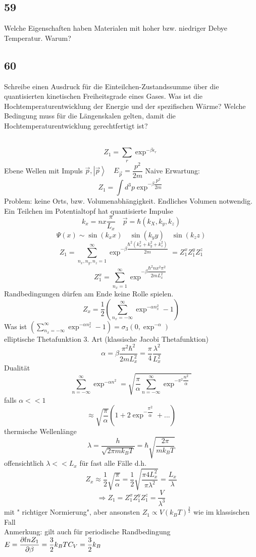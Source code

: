 \documentclass[12pt,a4paper]{report}
\newenvironment{myfrag}{\begin{it}}{\end{it}\vspace{3mm}\par}
\numberwithin{equation}{section}
\begin{document}
\subsection{59}
\begin{myfrag}
Welche Eigenschaften haben Materialen mit hoher bzw. niedriger Debye
Temperatur. Warum?
\end{myfrag}
\subsection{60}
\begin{myfrag}
Schreibe einen Ausdruck für die Einteilchen-Zustandssumme über die
quantisierten kinetischen Freiheitsgrade eines Gases. Was ist die
Hochtemperaturentwicklung der Energie und der spezifischen Wärme?
Welche Bedingung muss für die Längenskalen gelten, damit die
Hochtemperaturentwicklung gerechtfertigt ist?
\end{myfrag} \quad \\
$$ Z_1 = \sum \limits _r \exp ^{-\beta \epsilon_r}$$
Ebene Wellen mit Impuls $\vec{p} ,\left| \vec{p} \right\rangle \quad E_{\vec{p}} = \dfrac{p^2}{2m}$
Naive Erwartung: $$ Z_1 = \int d^3 p \exp ^{-\beta \dfrac{p^2}{2m} } $$
Problem: keine Orts, bzw. Volumenabhängigkeit. Endliches Volumen notwendig. \\[1ex]
Ein Teilchen im Potentialtopf hat quantisierte Impulse
$$ k_x = n x \dfrac{\pi}{L_x} \quad \vec{p} = \hbar(k_X,k_y,k_z) $$
$$ \Psi(x) \sim \sin (k_x x) \quad \sin (k_y y) \quad \sin (k_z z)$$
$$ Z_1 = \sum \limits _{n_x,n_y,n_z=1}^\infty \exp ^{ -\beta \dfrac{\hbar ^2 ( k_x^2 + k_y ^2 + k_z ^2)}{2m}} = Z_1^x Z_1^y Z_1^z$$
$$ Z_1 ^x = \sum \limits _{n_x = 1} ^\infty \exp ^{-\beta \dfrac{\hbar ^2 n x^2 \pi^2}{2m L_x^2}}$$
Randbedingungen dürfen am Ende keine Rolle spielen.
$$ Z_x = \dfrac{1}{2} \left( \sum \limits _{n_x = - \infty } ^\infty \exp ^ { - \alpha n_x ^2} -1 \right)$$
Was ist \qquad $\left( \sum \limits _{n_x = - \infty } ^\infty \exp ^ { - \alpha n_x ^2} -1 \right) = \sigma _3 (0, \exp ^{- \alpha } ) $ \\ elliptische Thetafunktion 3. Art (klassische Jacobi Thetafunktion)
$$ \alpha = \beta \dfrac{\pi ^2 \hbar ^2}{2m L_x ^2} = \dfrac{\pi}{4} \dfrac{\lambda ^2}{L_x^2}$$
Dualität 
$$\sum \limits _{n = - \infty } ^\infty \exp ^ { - \alpha n^2} = \sqrt{\dfrac{\pi}{\alpha} \sum \limits _{n = - \infty } ^\infty \exp ^ { - \pi ^2 \dfrac{n^2}{\alpha}}}$$
falls $\alpha << 1$ 
$$ \approx \sqrt{\dfrac{\pi}{\alpha }} \left( 1+ 2 \exp ^{ -\dfrac{\pi ^2}{\alpha } } + ...\right) $$
thermische Wellenlänge
$$ \lambda = \dfrac{h}{\sqrt{2 \pi m k_B T}} = \hbar \sqrt{\dfrac{2\pi}{m k_B T}} $$
offensichtlich $ \lambda << L_x$ für fast alle Fälle d.h. 
$$Z_x \approx \dfrac{1}{2} \sqrt{\dfrac{\pi}{\alpha}} = \dfrac{1}{2} \sqrt{\dfrac{\pi 4 L_x^2}{\pi \lambda ^2}} = \dfrac{L_x}{\lambda }$$
$$ \Rightarrow Z_1 = Z_1^x Z_1^y Z_1^z = \dfrac{V}{\lambda ^3} $$ 
mit " richtiger Normierung", aber ansonsten $Z_1 \propto V(k_B T ) ^\frac{3}{2} $ wie im klassischen Fall \\
Anmerkung: gilt auch für periodische Randbedingung \\[1.5ex]
$ E = \dfrac{\partial ln Z_1}{\partial \beta} = \dfrac{3}{2} k_B T \\[1.5ex]
C_V = \dfrac{3}{2} k_B$
\end{document}
